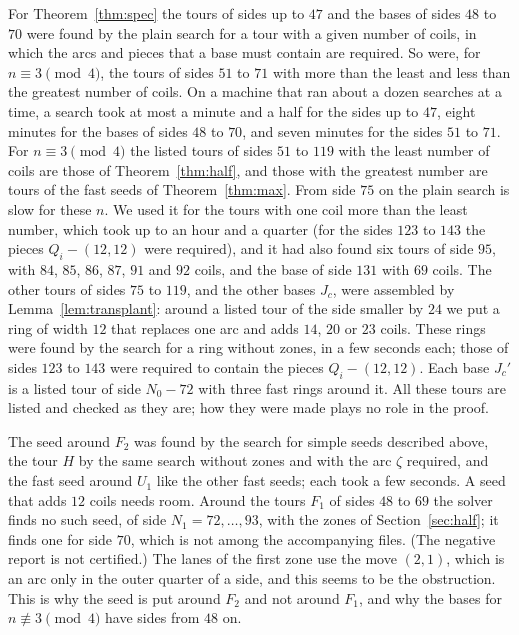 \documentclass[11pt]{amsart}
\theoremstyle{remark}
\begin{document}
For Theorem~\ref{thm:spec} the tours of sides up to $47$ and the bases of sides $48$ to $70$ were found by the plain
search for a tour with a given number of coils, in which the arcs and pieces that a base must contain are required.
So were, for $n\equiv3\pmod 4$, the tours of sides $51$ to $71$ with more than the least and less than the greatest
number of coils. On a machine that ran about a dozen searches at a time, a search took at most a minute and a half
for the sides up to $47$, eight minutes for the bases of sides $48$ to $70$, and seven minutes for the sides $51$ to
$71$. For $n\equiv3\pmod 4$ the listed tours of sides $51$ to $119$ with the least number of coils are those of
Theorem~\ref{thm:half}, and those with the greatest number are tours of the fast seeds of Theorem~\ref{thm:max}.
From side $75$ on the plain search is slow for these $n$. We used it for the tours with one coil more than the least
number, which took up to an hour and a quarter (for the sides $123$ to $143$ the pieces $Q_i-(12,12)$ were
required), and it had also found six tours of side $95$, with $84$, $85$, $86$, $87$, $91$ and $92$ coils, and the
base of side $131$ with $69$ coils. The other tours of sides $75$ to $119$, and the other bases $J_c$, were assembled
by Lemma~\ref{lem:transplant}: around a listed tour of the side smaller by $24$ we put a ring of width $12$ that
replaces one arc and adds $14$, $20$ or $23$ coils. These rings were found by the search for a ring without zones,
in a few seconds each; those of sides $123$ to $143$ were required to contain the pieces $Q_i-(12,12)$. Each base
$J_c'$ is a listed tour of side $N_0-72$ with three fast rings around it. All these tours are listed and checked as
they are; how they were made plays no role in the proof.

The seed around $F_2$ was found by the search for simple seeds described above, the tour $H$ by the same search
without zones and with the arc $\zeta$ required, and the fast seed around $U_1$ like the other fast seeds; each
took a few seconds. A seed that adds $12$ coils needs room. Around the tours $F_1$ of sides $48$ to $69$ the solver
finds no such seed, of side $N_1=72,\dots,93$, with the zones of Section~\ref{sec:half}; it finds one for side $70$,
which is not among the accompanying files. (The negative report is not certified.) The lanes of the first zone use the move $(2,1)$, which is an arc only in the outer
quarter of a side, and this seems to be the obstruction. This is why the seed is put around $F_2$ and not around
$F_1$, and why the bases for $n\not\equiv3\pmod 4$ have sides from $48$ on.
\end{document}
